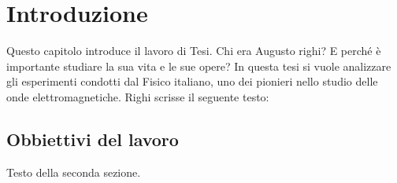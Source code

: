 \chapter*{Introduzione}

Questo capitolo introduce il lavoro di Tesi.
Chi era Augusto righi? E perché è importante studiare la sua vita e le sue opere?
In questa tesi si vuole analizzare gli esperimenti condotti dal Fisico italiano, 
uno dei pionieri nello studio delle onde elettromagnetiche.
Righi scrisse il seguente testo: \cite{righi1897ottica}
\section{Obbiettivi del lavoro}

Testo della seconda sezione.

